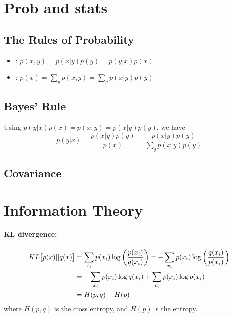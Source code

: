 \documentclass[11pt]{article}
\begin{document}
\section{Prob and stats}
\subsection{The Rules of Probability}
\begin{itemize}
  \item {}: $p(x, y) = p(x|y) p(y) = p(y|x) p(x)$
  \item {}: $p(x) = \sum\limits_y p(x, y) = \sum\limits_y p(x | y) p(y)$
\end{itemize}

\subsection{Bayes' Rule}
Using $p(y|x) p(x) = p(x, y) = p(x|y) p(y)$, we have
\begin{equation}
  p(y|x) = \frac{p(x|y) p(y)}{p(x)} = \frac{p(x|y) p(y)}{\sum\limits_y p(x|y) p(y)}
\end{equation}

\subsection{Covariance}


\section{Information Theory}
\paragraph{KL divergence:}
\begin{align}
  KL\big[p(x) || q(x)\big] &= \sum_{x_i} p(x_i) \log\left(\frac{p(x_i)}{q(x_i)} \right)
                              = -\sum_{x_i} p(x_i) \log\left(\frac{q(x_i)}{p(x_i)}
                              \right) \nonumber\\ 
  &= -\sum_{x_i} p(x_i) \log q(x_i) + \sum_{x_i} p(x_i) \log p(x_i) \nonumber\\
  &= H(p,q) - H(p)
\end{align}
where $H(p,q)$ is the cross entropy, and $H(p)$ is the entropy.


\end{document}
